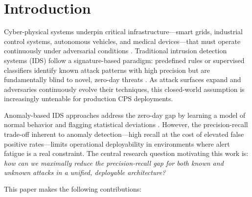 \documentclass[10pt,journal,compsoc]{IEEEtran}
\begin{document}
\section{Introduction}
\label{sec:intro}

Cyber-physical systems underpin critical infrastructure---smart grids,
industrial control systems, autonomous vehicles, and medical
devices---that must operate continuously under adversarial conditions
\cite{raza2013svelte}.  Traditional intrusion detection systems (IDS)
follow a signature-based paradigm: predefined rules or supervised
classifiers identify known attack patterns with high precision but are
fundamentally blind to novel, zero-day threats
\cite{liao2013intrusion, sommer2010outside}.  As attack surfaces
expand and adversaries continuously evolve their techniques, this
closed-world assumption is increasingly untenable for production CPS
deployments.

Anomaly-based IDS approaches address the zero-day gap by learning a
model of normal behavior and flagging statistical deviations
\cite{garcia2009anomaly}.  However, the precision-recall trade-off
inherent to anomaly detection---high recall at the cost of elevated
false positive rates---limits operational deployability in environments
where alert fatigue is a real constraint.  The central research
question motivating this work is: \emph{how can we maximally reduce
the precision-recall gap for both known and unknown attacks in a
unified, deployable architecture?}

This paper makes the following contributions:
\end{document}
